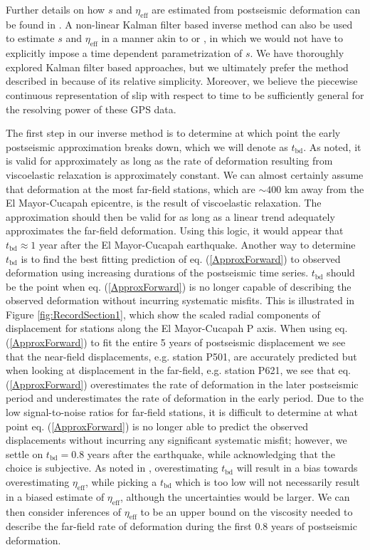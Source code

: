 \documentclass[review]{elsarticle}
\begin{document}
Further details on how $s$ and $\eta_\mathrm{eff}$ are estimated from postseismic deformation can be found in \citet{Hines2015}. A non-linear Kalman filter based inverse method can also be used to estimate $s$ and $\eta_{\mathrm{eff}}$ in a manner akin to \citet{Segall1997} or \citet{McGuire2003}, in which we would not have to explicitly impose a time dependent parametrization of $s$. We have thoroughly explored Kalman filter based approaches, but we ultimately prefer the method described in \citet{Hines2015} because of its relative simplicity. Moreover, we believe the piecewise continuous representation of slip with respect to time to be sufficiently general for the resolving power of these GPS data.

The first step in our inverse method is to determine at which point the early postseismic approximation breaks down, which we will denote as $t_{\mathrm{bd}}$.  As noted, it is valid for approximately as long as the rate of deformation resulting from viscoelastic relaxation is approximately constant. We can almost certainly assume that deformation at the most far-field stations, which are $\sim400$ km away from the El Mayor-Cucapah epicentre, is the result of viscoelastic relaxation. The approximation should then be valid for as long as a linear trend adequately approximates the far-field deformation. Using this logic, it would appear that $t_{\mathrm{bd}}\approx1$ year after the El Mayor-Cucapah earthquake.  Another way to determine $t_{\mathrm{bd}}$ is to find the best fitting prediction of eq. (\ref{ApproxForward}) to observed deformation using increasing durations of the postseismic time series.  $t_\mathrm{bd}$ should be the point when eq. (\ref{ApproxForward}) is no longer capable of describing the observed deformation without incurring systematic misfits.  This is illustrated in Figure \ref{fig:RecordSection1}, which show the scaled radial components of displacement for stations along the El Mayor-Cucapah P axis.  When using eq. (\ref{ApproxForward}) to fit the entire 5 years of postseismic displacement we see that the near-field displacements, e.g. station P501, are accurately predicted but when looking at displacement in the far-field, e.g. station P621, we see that eq. (\ref{ApproxForward}) overestimates the rate of deformation in the later postseismic period and underestimates the rate of deformation in the early period.  Due to the low signal-to-noise ratios for far-field stations, it is difficult to determine at what point eq. (\ref{ApproxForward}) is no longer able to predict the observed displacements without incurring any significant systematic misfit; however, we settle on $t_{\mathrm{bd}}=0.8$ years after the earthquake, while acknowledging that the choice is subjective. As noted in \citet{Hines2015}, overestimating $t_{\mathrm{bd}}$ will result in a bias towards overestimating $\eta_{\mathrm{eff}}$, while picking a $t_\mathrm{bd}$ which is too low will not necessarily result in a biased estimate of $\eta_\mathrm{eff}$, although the uncertainties would be larger. We can then consider inferences of $\eta_{\mathrm{eff}}$ to be an upper bound on the viscosity needed to describe the far-field rate of deformation during the first 0.8 years of postseismic deformation. 
\end{document}
